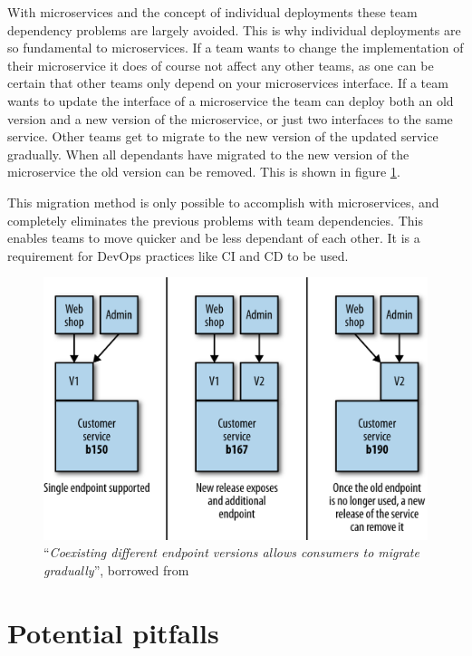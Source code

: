 \documentclass{article}
\begin{document}
With microservices and the concept of individual deployments these team dependency problems are largely avoided. This is why individual deployments are so fundamental to microservices. If a team wants to change the implementation of their microservice it does of course not affect any other teams, as one can be certain that other teams only depend on your microservices interface. If a team wants to update the interface of a microservice the team can deploy both an old version and a new version of the microservice, or just two interfaces to the same service. Other teams get to migrate to the new version of the updated service gradually. When all dependants have migrated to the new version of the microservice the old version can be removed. This is shown in figure \ref{fig:microservice-versioning}.

This migration method is only possible to accomplish with microservices, and completely eliminates the previous problems with team dependencies. This enables teams to move quicker and be less dependant of each other. It is a requirement for DevOps practices like CI and CD to be used.

\begin{figure}
    \centering
    \includegraphics[width=\textwidth]{microservice-versioning.png}
    \caption{``\textit{Coexisting different endpoint versions allows consumers to migrate gradually}'', borrowed from \cite{Newman2015}}
    \label{fig:microservice-versioning}
\end{figure}


\section{Potential pitfalls}
\end{document}
